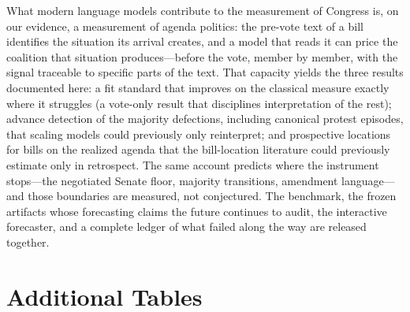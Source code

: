 \documentclass[12pt]{article}
\begin{document}
What modern language models contribute to the measurement of Congress
is, on our evidence, a measurement of agenda politics: the pre-vote
text of a bill identifies the situation its arrival creates, and a
model that reads it can price the coalition that situation
produces---before the vote, member by member, with the signal
traceable to specific parts of the text. That capacity yields the
three results documented here: a fit standard that improves on the
classical measure exactly where it struggles (a vote-only result that
disciplines interpretation of the rest); advance detection of the
majority defections, including canonical protest episodes, that
scaling models could previously only reinterpret; and prospective
locations for bills on the realized agenda that the bill-location
literature could previously estimate only in retrospect. The same
account predicts where the instrument stops---the negotiated Senate
floor, majority transitions, amendment language---and those
boundaries are measured, not conjectured. The benchmark, the frozen
artifacts whose forecasting claims the future continues to audit, the
interactive forecaster, and a complete ledger of what failed along
the way are released together.




\appendix

\section{Additional Tables}
\label{app:tables}

\begin{table}[h]
\centering
\caption{Completion regime (held-out vote completion; same-rollcall
votes observable): the psychometric ladder.}
\label{tab:regimeA}

\end{table}

\begin{table}[h]
\centering
\caption{The 2011--2016 text-based architectures, reimplemented and
evaluated under identical conditions.}
\label{tab:lit}
{\footnotesize }
\end{table}

\begin{table}[h]
\centering
\caption{Benchmark card. Composition by congress block and chamber;
``bill-linked'' is the share of rollcalls tied to a legislative
measure, ``pre-vote summary'' the share whose leakage-clean text
template draws on a CRS summary dated before the vote, and ``title
only'' the share whose bill text is a title. The bottom panel reports
temporal-holdout log loss by text-coverage cell.}
\label{tab:benchcard}
{\small }
\end{table}
\end{document}
